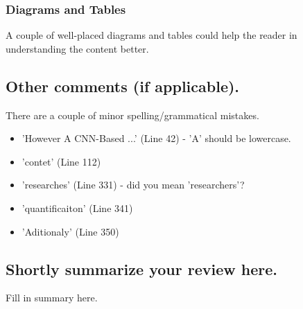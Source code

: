 \documentclass[12pt]{article}
\begin{document}
\subsubsection*{Diagrams and Tables}
A couple of well-placed diagrams and tables could help the reader in understanding the content better.

\subsection*{Other comments (if applicable).}
There are a couple of minor spelling/grammatical mistakes.
\begin{itemize}
    \item 'However A CNN-Based ...' (Line 42) - 'A' should be lowercase.
    \item 'contet' (Line 112) 
    \item 'researches' (Line 331) - did you mean 'researchers'?
    \item 'quantificaiton' (Line 341)
    \item 'Aditionaly' (Line 350)
\end{itemize}

\subsection*{Shortly summarize your review here.}
Fill in summary here.
\end{document}
